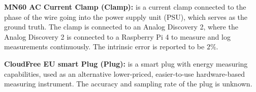 \noindent\textbf{MN60 AC Current Clamp (Clamp):} is a current clamp connected to the phase of the wire going into the power supply unit (PSU), which serves as the ground truth. The clamp is connected to an Analog Discovery 2, where the Analog Discovery 2 is connected to a Raspberry Pi 4 to measure and log measurements continuously.\cite{biksbois} The intrinsic error is reported to be $2\%$\cite{ClampDoc}.\newline

\noindent\textbf{CloudFree EU smart Plug (Plug):} is a smart plug with energy measuring capabilities, used as an alternative lower-priced, easier-to-use hardware-based measuring instrument. The accuracy and sampling rate of the plug is unknown.\cite{CloudFreeEUSMartPlug}\newline